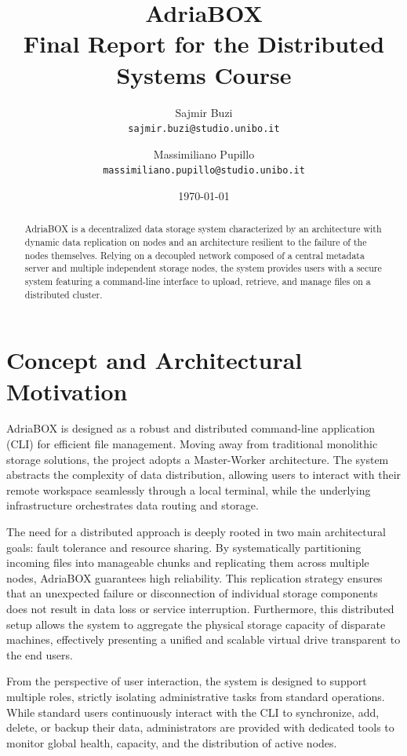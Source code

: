 \documentclass[11pt, a4paper]{article}
\title{AdriaBOX\\ \large Final Report for the Distributed Systems Course}
\author{
  Sajmir Buzi \\ \texttt{sajmir.buzi@studio.unibo.it}
  \and
  Massimiliano Pupillo \\ \texttt{massimiliano.pupillo@studio.unibo.it}
}
\date{\today}
\begin{document}
\maketitle

\begin{abstract}
AdriaBOX is a decentralized data storage system characterized by an architecture with dynamic data replication on nodes and an architecture resilient to the failure of the nodes themselves. Relying on a decoupled network composed of a central metadata server and multiple independent storage nodes, the system provides users with a secure system featuring a command-line interface to upload, retrieve, and manage files on a distributed cluster.
\end{abstract}

\section{Concept and Architectural Motivation}
AdriaBOX is designed as a robust and distributed command-line application (CLI) for efficient file management. Moving away from traditional monolithic storage solutions, the project adopts a Master-Worker architecture. The system abstracts the complexity of data distribution, allowing users to interact with their remote workspace seamlessly through a local terminal, while the underlying infrastructure orchestrates data routing and storage.

The need for a distributed approach is deeply rooted in two main architectural goals: fault tolerance and resource sharing. By systematically partitioning incoming files into manageable chunks and replicating them across multiple nodes, AdriaBOX guarantees high reliability. This replication strategy ensures that an unexpected failure or disconnection of individual storage components does not result in data loss or service interruption. Furthermore, this distributed setup allows the system to aggregate the physical storage capacity of disparate machines, effectively presenting a unified and scalable virtual drive transparent to the end users.

From the perspective of user interaction, the system is designed to support multiple roles, strictly isolating administrative tasks from standard operations. While standard users continuously interact with the CLI to synchronize, add, delete, or backup their data, administrators are provided with dedicated tools to monitor global health, capacity, and the distribution of active nodes.
\end{document}
